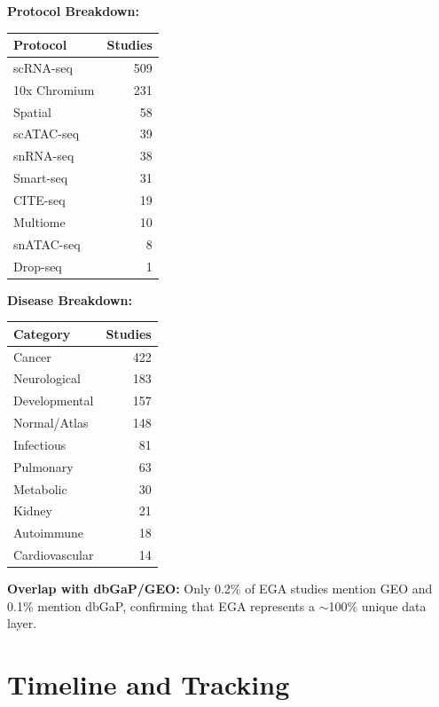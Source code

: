 \documentclass[11pt,letterpaper]{article}
\begin{document}
\begin{minipage}[t]{0.48\textwidth}
\textbf{Protocol Breakdown:}
\begin{tabular}{@{} l r @{}}
\toprule
\textbf{Protocol} & \textbf{Studies} \\
\midrule
scRNA-seq & 509 \\
10x Chromium & 231 \\
Spatial & 58 \\
scATAC-seq & 39 \\
snRNA-seq & 38 \\
Smart-seq & 31 \\
CITE-seq & 19 \\
Multiome & 10 \\
snATAC-seq & 8 \\
Drop-seq & 1 \\
\bottomrule
\end{tabular}
\end{minipage}
\hfill
\begin{minipage}[t]{0.48\textwidth}
\textbf{Disease Breakdown:}
\begin{tabular}{@{} l r @{}}
\toprule
\textbf{Category} & \textbf{Studies} \\
\midrule
Cancer & 422 \\
Neurological & 183 \\
Developmental & 157 \\
Normal/Atlas & 148 \\
Infectious & 81 \\
Pulmonary & 63 \\
Metabolic & 30 \\
Kidney & 21 \\
Autoimmune & 18 \\
Cardiovascular & 14 \\
\bottomrule
\end{tabular}
\end{minipage}

\bigskip
\noindent \textbf{Overlap with dbGaP/GEO:} Only 0.2\% of EGA studies
mention GEO and 0.1\% mention dbGaP, confirming that EGA represents a
$\sim$100\% unique data layer.

\section{Timeline and Tracking}
\end{document}
